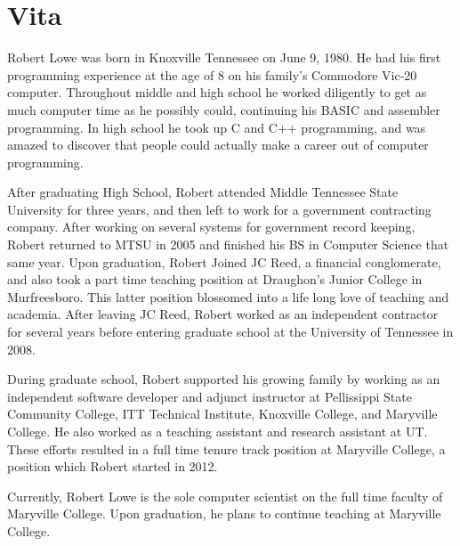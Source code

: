 \chapter*{Vita} \label{ch:vita}
Robert Lowe was born in Knoxville Tennessee on June 9, 1980.  He had
his first programming experience at the age of 8 on his family's
Commodore Vic-20 computer.  Throughout middle and high school he
worked diligently to get as much computer time as he possibly could,
continuing his BASIC and assembler programming.
In high school he took up C and C++ programming, and was amazed to
discover that people could actually make a career out of computer
programming.

After graduating High School, Robert attended Middle Tennessee State
University for three years, and then left to work for a government
contracting company.  After working on several systems for government
record keeping, Robert returned to MTSU in 2005 and finished his BS in
Computer Science that same year.  Upon graduation, Robert Joined JC
Reed, a financial conglomerate, and also took a part time teaching
position at Draughon's Junior College in Murfreesboro.  This latter
position blossomed into a life long love of teaching and academia.
After leaving JC Reed, Robert worked as an independent contractor for
several years before entering graduate school at the University of
Tennessee in 2008.

During graduate school, Robert supported his growing family by working
as an independent software developer and adjunct instructor at
Pellissippi State Community College, ITT Technical Institute,
Knoxville College, and Maryville College.  He also worked as a
teaching assistant and research assistant at UT.  These efforts
resulted in a full time tenure track position at Maryville College, a
position which Robert started in 2012.

Currently, Robert Lowe is the sole computer scientist on the full time
faculty of Maryville College.  Upon graduation, he plans to continue
teaching at Maryville College.
